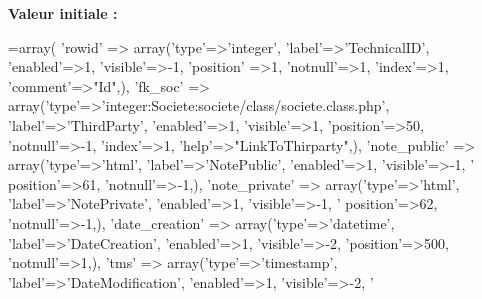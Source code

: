 {\bfseries Valeur initiale \+:}
\begin{DoxyCode}
=array(
        \textcolor{stringliteral}{'rowid'} => array(\textcolor{stringliteral}{'type'}=>\textcolor{stringliteral}{'integer'}, \textcolor{stringliteral}{'label'}=>\textcolor{stringliteral}{'TechnicalID'}, \textcolor{stringliteral}{'enabled'}=>1, \textcolor{stringliteral}{'visible'}=>-1, \textcolor{stringliteral}{'position'}
      =>1, \textcolor{stringliteral}{'notnull'}=>1, \textcolor{stringliteral}{'index'}=>1, \textcolor{stringliteral}{'comment'}=>\textcolor{stringliteral}{"Id"},),
        \textcolor{stringliteral}{'fk\_soc'} => array(\textcolor{stringliteral}{'type'}=>\textcolor{stringliteral}{'integer:Societe:societe/class/societe.class.php'}, \textcolor{stringliteral}{'label'}=>\textcolor{stringliteral}{'ThirdParty'},
       \textcolor{stringliteral}{'enabled'}=>1, \textcolor{stringliteral}{'visible'}=>1, \textcolor{stringliteral}{'position'}=>50, \textcolor{stringliteral}{'notnull'}=>-1, \textcolor{stringliteral}{'index'}=>1, \textcolor{stringliteral}{'help'}=>\textcolor{stringliteral}{"LinkToThirparty"},),
        \textcolor{stringliteral}{'note\_public'} => array(\textcolor{stringliteral}{'type'}=>\textcolor{stringliteral}{'html'}, \textcolor{stringliteral}{'label'}=>\textcolor{stringliteral}{'NotePublic'}, \textcolor{stringliteral}{'enabled'}=>1, \textcolor{stringliteral}{'visible'}=>-1, \textcolor{stringliteral}{'
      position'}=>61, \textcolor{stringliteral}{'notnull'}=>-1,),
        \textcolor{stringliteral}{'note\_private'} => array(\textcolor{stringliteral}{'type'}=>\textcolor{stringliteral}{'html'}, \textcolor{stringliteral}{'label'}=>\textcolor{stringliteral}{'NotePrivate'}, \textcolor{stringliteral}{'enabled'}=>1, \textcolor{stringliteral}{'visible'}=>-1, \textcolor{stringliteral}{'
      position'}=>62, \textcolor{stringliteral}{'notnull'}=>-1,),
        \textcolor{stringliteral}{'date\_creation'} => array(\textcolor{stringliteral}{'type'}=>\textcolor{stringliteral}{'datetime'}, \textcolor{stringliteral}{'label'}=>\textcolor{stringliteral}{'DateCreation'}, \textcolor{stringliteral}{'enabled'}=>1, \textcolor{stringliteral}{'visible'}=>-2, \textcolor{stringliteral}{
      'position'}=>500, \textcolor{stringliteral}{'notnull'}=>1,),
        \textcolor{stringliteral}{'tms'} => array(\textcolor{stringliteral}{'type'}=>\textcolor{stringliteral}{'timestamp'}, \textcolor{stringliteral}{'label'}=>\textcolor{stringliteral}{'DateModification'}, \textcolor{stringliteral}{'enabled'}=>1, \textcolor{stringliteral}{'visible'}=>-2, \textcolor{stringliteral}{'
}
\end{DoxyCode}
